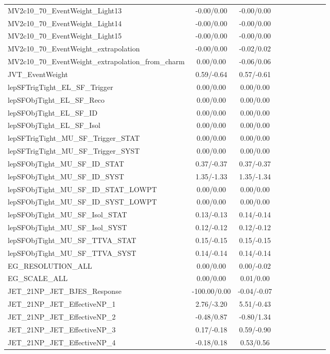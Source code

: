\begin{table}[h]
\begin{center}
\begin{tabular}{l|ccccccccc}
MV2c10\_70\_EventWeight\_Light13 &-0.00/0.00 &-0.00/0.00 \\
MV2c10\_70\_EventWeight\_Light14 &-0.00/0.00 &-0.00/0.00 \\
MV2c10\_70\_EventWeight\_Light15 &-0.00/0.00 &-0.00/0.00 \\
MV2c10\_70\_EventWeight\_extrapolation &-0.00/0.00 &-0.02/0.02 \\
MV2c10\_70\_EventWeight\_extrapolation\_from\_charm &0.00/0.00 &-0.06/0.06 \\
JVT\_EventWeight &0.59/-0.64 &0.57/-0.61 \\
lepSFTrigTight\_EL\_SF\_Trigger &0.00/0.00 &0.00/0.00 \\
lepSFObjTight\_EL\_SF\_Reco &0.00/0.00 &0.00/0.00 \\
lepSFObjTight\_EL\_SF\_ID &0.00/0.00 &0.00/0.00 \\
lepSFObjTight\_EL\_SF\_Isol &0.00/0.00 &0.00/0.00 \\
lepSFTrigTight\_MU\_SF\_Trigger\_STAT &0.00/0.00 &0.00/0.00 \\
lepSFTrigTight\_MU\_SF\_Trigger\_SYST &0.00/0.00 &0.00/0.00 \\
lepSFObjTight\_MU\_SF\_ID\_STAT &0.37/-0.37 &0.37/-0.37 \\
lepSFObjTight\_MU\_SF\_ID\_SYST &1.35/-1.33 &1.35/-1.34 \\
lepSFObjTight\_MU\_SF\_ID\_STAT\_LOWPT &0.00/0.00 &0.00/0.00 \\
lepSFObjTight\_MU\_SF\_ID\_SYST\_LOWPT &0.00/0.00 &0.00/0.00 \\
lepSFObjTight\_MU\_SF\_Isol\_STAT &0.13/-0.13 &0.14/-0.14 \\
lepSFObjTight\_MU\_SF\_Isol\_SYST &0.12/-0.12 &0.12/-0.12 \\
lepSFObjTight\_MU\_SF\_TTVA\_STAT &0.15/-0.15 &0.15/-0.15 \\
lepSFObjTight\_MU\_SF\_TTVA\_SYST &0.14/-0.14 &0.14/-0.14 \\
EG\_RESOLUTION\_ALL &0.00/0.00 &0.00/-0.02 \\
EG\_SCALE\_ALL &0.00/0.00 &0.01/0.00 \\
JET\_21NP\_JET\_BJES\_Response &-100.00/0.00 &-0.04/-0.07 \\
JET\_21NP\_JET\_EffectiveNP\_1 &2.76/-3.20 &5.51/-0.43 \\
JET\_21NP\_JET\_EffectiveNP\_2 &-0.48/0.87 &-0.80/1.34 \\
JET\_21NP\_JET\_EffectiveNP\_3 &0.17/-0.18 &0.59/-0.90 \\
JET\_21NP\_JET\_EffectiveNP\_4 &-0.18/0.18 &0.53/0.56 \\

\end{tabular}
\end{center}
\end{table}
